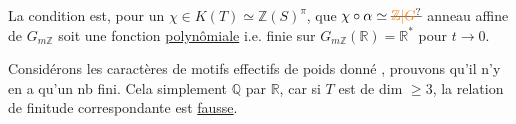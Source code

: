 La condition est,  pour un $\chi\in K(T)\simeq\mathbb Z(S)^\pi$, que $\chi\circ\alpha\simeq\deleted{\unsure{\mathbb Z|G}}$ anneau affine de $G_{m\mathbb Z}$ soit une fonction \uline{polynômiale} i.e.  finie sur $G_{m\mathbb Z}(\mathbb R)=\mathbb R^*$ pour $t\to0$.

Considérons les caractères de motifs effectifs de poids donné , prouvons qu'il n'y en a qu'un nb fini. Cela    simplement    $\mathbb Q$ par $\mathbb R$,  car si $T$ est de dim $\geq3$, la relation de finitude correspondante est \uline{fausse}.

